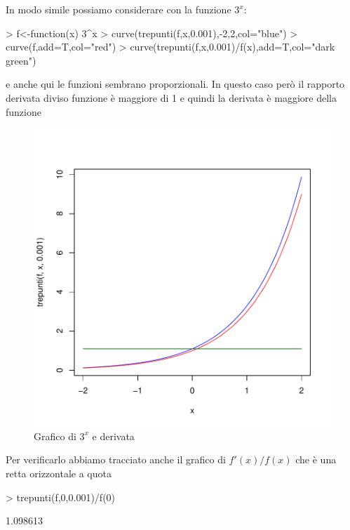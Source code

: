 \documentclass[onecolumn,11pt]{book}
\begin{document}
In modo simile possiamo considerare con la funzione $3^x$:
\begin{Schunk}
\begin{Sinput}
> f<-function(x) 3^x
> curve(trepunti(f,x,0.001),-2,2,col="blue")
> curve(f,add=T,col="red")
> curve(trepunti(f,x,0.001)/f(x),add=T,col="dark green")
\end{Sinput}
\end{Schunk}
e anche qui  le funzioni sembrano proporzionali. In questo caso per\`o il rapporto derivata diviso funzione \`e  maggiore di 1 e quindi la derivata \`e maggiore della funzione
\begin{figure}[ htbp]
\begin{center}
\includegraphics{Rmatematica-121}
\caption{Grafico di $3^x$ e derivata}
\label{fig:der3x}
\end{center}
\end{figure}

Per verificarlo abbiamo tracciato anche il grafico di $f'(x)/f(x)$ che \`e una retta orizzontale a quota
\begin{Schunk}
\begin{Sinput}
> trepunti(f,0,0.001)/f(0)
\end{Sinput}
\begin{Soutput}
[1] 1.098613
\end{Soutput}
\end{Schunk}
\end{document}
